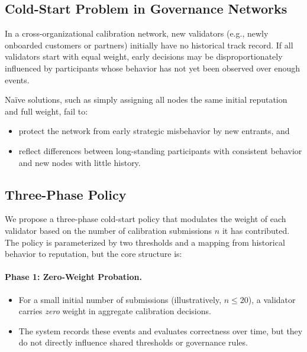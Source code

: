 \documentclass[11pt]{article}
\begin{document}
\subsection{Cold-Start Problem in Governance Networks}

In a cross-organizational calibration network, new validators (e.g., newly onboarded customers or partners) initially have no historical track record.
If all validators start with equal weight, early decisions may be disproportionately influenced by participants whose behavior has not yet been observed over enough events.

Na{\"i}ve solutions, such as simply assigning all nodes the same initial reputation and full weight, fail to:
\begin{itemize}[leftmargin=*]
  \item protect the network from early strategic misbehavior by new entrants, and
  \item reflect differences between long-standing participants with consistent behavior and new nodes with little history.
\end{itemize}

\subsection{Three-Phase Policy}

We propose a three-phase cold-start policy that modulates the weight of each validator based on the number of calibration submissions \(n\) it has contributed.
The policy is parameterized by two thresholds and a mapping from historical behavior to reputation, but the core structure is:

\paragraph{Phase 1: Zero-Weight Probation.}
\begin{itemize}[leftmargin=*]
  \item For a small initial number of submissions (illustratively, \(n \le 20\)), a validator carries \emph{zero} weight in aggregate calibration decisions.
  \item The system records these events and evaluates correctness over time, but they do not directly influence shared thresholds or governance rules.
\end{itemize}
\end{document}
